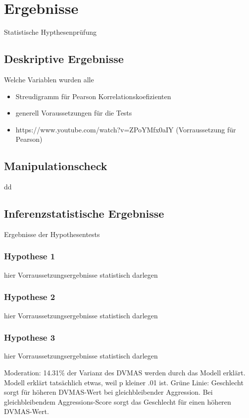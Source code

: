 \chapter{Ergebnisse}   \label{ch_4}
Statistische Hypthesenprüfung

\section{Deskriptive Ergebnisse}    \label{sec_4.1}
Welche Variablen wurden alle
\begin{itemize}
    \item Streudigramm für Pearson Korrelationskoefizienten
    \item generell Voraussetzungen für die Tests
    \item https://www.youtube.com/watch?v=ZPoYMfx0aIY (Vorraussetzung für Pearson)
\end{itemize}

\section{Manipulationscheck}    \label{sec_4.2}
dd


\section{Inferenzstatistische Ergebnisse}    \label{sec_4.3}
Ergebnisse der Hypothesentests


\subsection{Hypothese 1}    \label{subsec_4.3.1}
hier Vorraussetzungsergebnisse statistisch darlegen


\subsection{Hypothese 2}    \label{subsec_4.3.2}
hier Vorraussetzungsergebnisse statistisch darlegen


\subsection{Hypothese 3}    \label{subsec_4.3.3}
hier Vorraussetzungsergebnisse statistisch darlegen

Moderation: 14.31\% der Varianz des DVMAS werden durch das Modell erklärt.
Modell erklärt tatsächlich etwas, weil p kleiner .01 ist.
Grüne Linie: Geschlecht sorgt für höheren DVMAS-Wert bei gleichbleibender Aggression. Bei gleichbleibendem Aggressions-Score sorgt das Geschlecht für einen höheren DVMAS-Wert.

